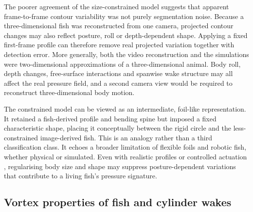 \documentclass[openacc]{rsproca_new}
\begin{document}
The poorer agreement of the size-constrained model suggests that apparent frame-to-frame contour variability was not purely segmentation noise. Because a three-dimensional fish was reconstructed from one camera, projected contour changes may also reflect posture, roll or depth-dependent shape. Applying a fixed first-frame profile can therefore remove real projected variation together with detection error. More generally, both the video reconstruction and the simulations were two-dimensional approximations of a three-dimensional animal. Body roll, depth changes, free-surface interactions and spanwise wake structure may all affect the real pressure field, and a second camera view would be required to reconstruct three-dimensional body motion.

The constrained model can be viewed as an intermediate, foil-like representation. It retained a fish-derived profile and bending spine but imposed a fixed characteristic shape, placing it conceptually between the rigid circle and the less-constrained image-derived fish. This is an analogy rather than a third classification class. It echoes a broader limitation of flexible foils and robotic fish, whether physical or simulated. Even with realistic profiles or controlled actuation \cite{maertens2017,li2021,feng2024,cui2024}, regularising body size and shape may suppress posture-dependent variations that contribute to a living fish's pressure signature.

\subsection{Vortex properties of fish and cylinder wakes}
\end{document}
